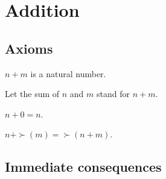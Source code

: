\documentclass[../../natural-numbers.ftl.tex]{subfiles}
\begin{document}


  \section{Addition}

  \subsection{Axioms}

  \begin{forthel}
    \begin{signature}
      $n + m$ is a natural number.
    \end{signature}

    Let the sum of $n$ and $m$ stand for $n + m$.

    \begin{axiom}
      $n + 0 = n$.
    \end{axiom}

    \begin{axiom}
      $n + \succ(m) = \succ(n + m)$.
    \end{axiom}
  \end{forthel}


  \subsection{Immediate consequences}
\end{document}
